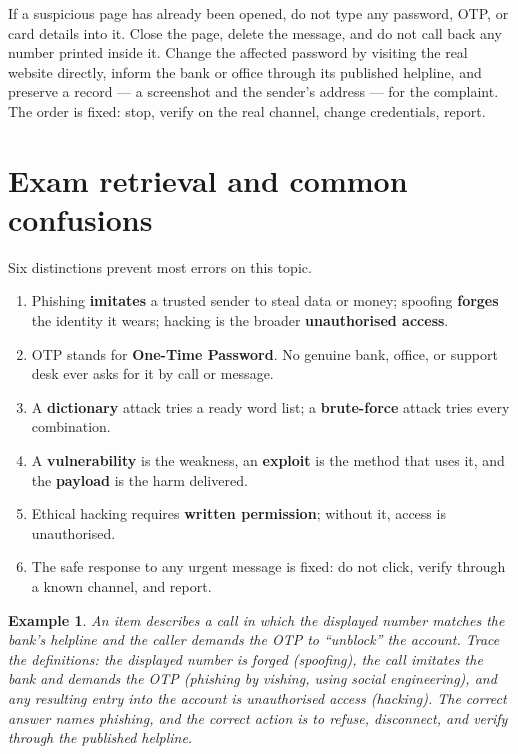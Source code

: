 \documentclass[11pt]{article}
\newtheorem{example}{Example}[section]
\begin{document}
If a suspicious page has already been opened, do not type any password,
OTP, or card details into it. Close the page, delete the message, and
do not call back any number printed inside it. Change the affected
password by visiting the real website directly, inform the bank or
office through its published helpline, and preserve a record --- a
screenshot and the sender's address --- for the complaint. The order is
fixed: stop, verify on the real channel, change credentials, report.

\section{Exam retrieval and common confusions}
Six distinctions prevent most errors on this topic.
\begin{enumerate}
  \item Phishing \textbf{imitates} a trusted sender to steal data or
    money; spoofing \textbf{forges} the identity it wears; hacking is
    the broader \textbf{unauthorised access}.
  \item OTP stands for \textbf{One-Time Password}. No genuine bank,
    office, or support desk ever asks for it by call or message.
  \item A \textbf{dictionary} attack tries a ready word list; a
    \textbf{brute-force} attack tries every combination.
  \item A \textbf{vulnerability} is the weakness, an \textbf{exploit} is
    the method that uses it, and the \textbf{payload} is the harm
    delivered.
  \item Ethical hacking requires \textbf{written permission}; without
    it, access is unauthorised.
  \item The safe response to any urgent message is fixed: do not click,
    verify through a known channel, and report.
\end{enumerate}

\begin{example}
An item describes a call in which the displayed number matches the
bank's helpline and the caller demands the OTP to ``unblock'' the
account. Trace the definitions: the displayed number is forged
(spoofing), the call imitates the bank and demands the OTP (phishing by
vishing, using social engineering), and any resulting entry into the
account is unauthorised access (hacking). The correct answer names
phishing, and the correct action is to refuse, disconnect, and verify
through the published helpline.
\end{example}
\end{document}
